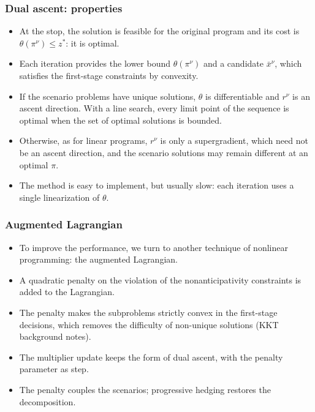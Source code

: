 \documentclass[aspectratio=169]{beamer}
\begin{document}
\begin{frame}
\frametitle{Dual ascent: properties}

\begin{itemize}
\item
At the stop, the solution is feasible for the original program and its cost is $\theta(\pi^{\nu}) \leq z^*$: it is optimal.
\item
Each iteration provides the lower bound $\theta(\pi^{\nu})$ and a candidate $\bar{x}^{\nu}$, which satisfies the first-stage constraints by convexity.
\item
If the scenario problems have unique solutions, $\theta$ is differentiable and $r^{\nu}$ is an {\blue ascent direction}. With a line search, every limit point of the sequence is optimal when the set of optimal solutions is bounded.
\item
Otherwise, as for linear programs, $r^{\nu}$ is only a supergradient, which need not be an ascent direction, and the scenario solutions may remain different at an optimal $\pi$.
\item
The method is easy to implement, but usually slow: each iteration uses a single linearization of $\theta$.
\end{itemize}

\end{frame}

\begin{frame}
\frametitle{Augmented Lagrangian}

\begin{itemize}
\item
To improve the performance, we turn to another technique of nonlinear programming: the {\blue augmented Lagrangian}.
\item
A quadratic penalty on the violation of the nonanticipativity constraints is added to the Lagrangian.
\item
The penalty makes the subproblems strictly convex in the first-stage decisions, which removes the difficulty of non-unique solutions (KKT background notes).
\item
The multiplier update keeps the form of dual ascent, with the penalty parameter as step.
\item
The penalty couples the scenarios; progressive hedging restores the decomposition.
\end{itemize}

\end{frame}

\end{document}
